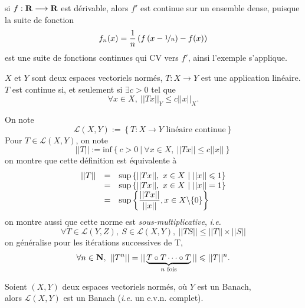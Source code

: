 \documentclass[a4paper,11pt, twoside]{article}
\begin{document}
\begin{RQ}
  si $f:\mathbf R\longrightarrow \mathbf R$ est dérivable, alors $f'$ est continue sur un ensemble dense, puisque la suite de fonction 
  $$f_n(x)=\frac{1}{n}\left(f\left(x-\nicefrac{1}{n}\right)-f(x)\right)$$
  est une suite de fonctions continues qui CV vers $f'$, ainsi l'exemple s'applique.
\end{RQ}





$X$ et $Y$ sont deux espaces vectoriels normés, $T:X\longrightarrow Y$ est une application linéaire.\\[1em]

$T$ est continue si, et seulement si $\exists c>0$ tel que
$$\forall x\in X,\ ||Tx||_Y\leqslant c||x||_X.$$

On note 
$$\mathcal L(X,Y):=\left\{T:X\longrightarrow Y\text{ linéaire continue}\right\}$$
Pour $T\in\mathcal L(X,Y)$, on note
$$||T||:=\mathrm{inf}\left\{c>0\ |\ \forall x\in X,\ ||Tx||\leqslant c||x||\right\}$$
on montre que cette définition est équivalente à
$$\begin{array}{rcl}
||T||&=&\mathrm{sup}\left\{||Tx||,\ x\in X\ |\ ||x||\leqslant 1\right\}\\
&=&\mathrm{sup}\left\{||Tx||,\ x\in X\ |\ ||x||= 1\right\}\\
&=&\mathrm{sup}\left\{\displaystyle\frac{||Tx||}{||x||}, x\in X\backslash\{0\}\right\}
\end{array}$$
on montre aussi que cette norme est \emph{sous-multiplicative}, \emph{i.e.}
$$\forall T\in\mathcal L(Y,Z),\ S\in\mathcal L(X,Y),\ ||TS||\leqslant ||T||\times ||S||$$
on généralise pour les itérations successives de T,
$$\forall n\in\mathbf N,\ ||T^n||=||\underbrace{T\circ T\cdots\circ T}_{n\text{ fois}}||\leqslant ||T||^n.$$

\begin{prop}
  Soient $(X,Y)$ deux espaces vectoriels normés, où $Y$ est un Banach,\\

  alors $\mathcal L(X,Y)$ est un Banach (\emph{i.e.} un e.v.n. complet).
\end{prop}
\end{document}
